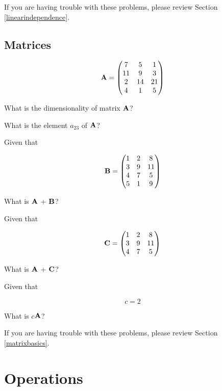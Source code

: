 \documentclass[]{book}
\theoremstyle{definition}
\theoremstyle{definition}
\theoremstyle{definition}
\theoremstyle{remark}
\begin{document}
If you are having trouble with these problems, please review Section \ref{linearindependence}.

\hypertarget{matrices}{%
\subsection*{Matrices}\label{matrices}}

\[{\bf A}=\begin{pmatrix}
            7 & 5 & 1 \\
            11 & 9 & 3 \\ 
            2 & 14 & 21 \\ 
            4 & 1 & 5
        \end{pmatrix}\]

What is the dimensionality of matrix \({\bf A}\)?

What is the element \(a_{23}\) of \({\bf A}\)?

Given that

\[{\bf B}=\begin{pmatrix}
            1 & 2 & 8 \\
            3 & 9 & 11 \\ 
            4 & 7 & 5 \\ 
            5 & 1 & 9
        \end{pmatrix}\]

What is \({\bf A}\) + \({\bf B}\)?

Given that

\[{\bf C}=\begin{pmatrix}
            1 & 2 & 8 \\
            3 & 9 & 11 \\ 
            4 & 7 & 5 \\ 
        \end{pmatrix}\]

What is \({\bf A}\) + \({\bf C}\)?

Given that

\[c = 2\]

What is \(c\)\({\bf A}\)?

If you are having trouble with these problems, please review Section \ref{matrixbasics}.

\hypertarget{operations}{%
\section*{Operations}\label{operations}}
\end{document}

